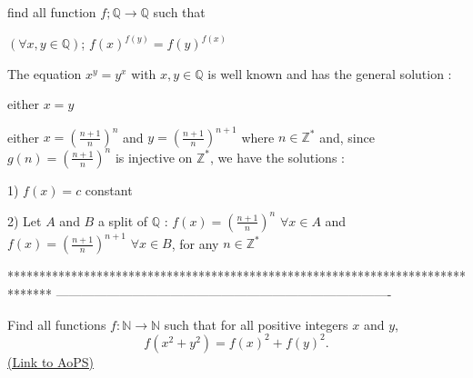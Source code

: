 \begin{solution}
	\begin{tcolorbox}find all function $ f;\mathbb{Q} \to \mathbb{Q}$
such that

$ (\forall x,y \in \mathbb{Q})$; $ f(x)^{f(y)} = f(y)^{f(x)}$\end{tcolorbox}
The equation $ x^y = y^x$ with $ x,y\in\mathbb Q$ is well known and has the general solution :

either $ x = y$

either $ x = \left(\frac {n + 1}n\right)^n$ and $ y = \left(\frac {n + 1}n\right)^{n + 1}$ where $ n\in\mathbb Z^*$ and, since $ g(n) = \left(\frac {n + 1}n\right)^n$ is injective on $ \mathbb Z^*$, we have the solutions :

1) $ f(x) = c$ constant

2) Let $ A$ and $ B$ a split of $ \mathbb Q$ :
$ f(x) = \left(\frac {n + 1}n\right)^n$ $ \forall x\in A$ and $ f(x) = \left(\frac {n + 1}n\right)^{n + 1}$ $ \forall x\in B$, for any $ n\in\mathbb Z^*$
\end{solution}
*******************************************************************************
-------------------------------------------------------------------------------

\begin{problem}
	Find all functions $f: \mathbb N \to \mathbb N$ such that for all positive integers $x$ and $y$,
\[f(x^2 + y^2) = f(x)^2 + f(y)^2.\]
	\flushright \href{https://artofproblemsolving.com/community/c6h320099}{(Link to AoPS)}
\end{problem}



